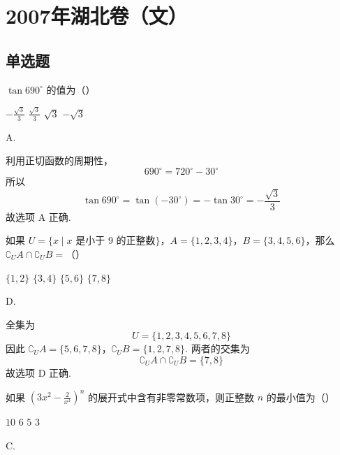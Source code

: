 \chapter{2007年湖北卷（文）}

\section{单选题}

\begin{problem}
\(\tan 690^{\circ}\) 的值为（\quad）

\choices
    {\( -\frac{\sqrt{3}}{3} \)}
    {\( \frac{\sqrt{3}}{3} \)}
    {\(\sqrt{3}\)}
    {\(-\sqrt{3}\)}
\end{problem}

\begin{answer}
A.
\end{answer}

\begin{solution}
利用正切函数的周期性，
\[
690^{\circ}=720^{\circ}-30^{\circ}
\]
所以
\[
\tan 690^{\circ}=\tan(-30^{\circ})=-\tan 30^{\circ}=-\frac{\sqrt{3}}{3}
\]
故选项 A 正确.
\end{solution}

\begin{problem}
如果 \( U = \{x \mid x \text{ 是小于 } 9 \text{ 的正整数}\} \)，\( A = \{1, 2, 3, 4\} \)，\( B = \{3, 4, 5, 6\} \)，那么 \( \complement_U A \cap \complement_U B = \)（\quad）

\choices
    {\( \{1, 2\} \)}
    {\( \{3, 4\} \)}
    {\( \{5, 6\} \)}
    {\(\{7,8\}\)}
\end{problem}

\begin{answer}
D.
\end{answer}

\begin{solution}
全集为
\[
U=\{1,2,3,4,5,6,7,8\}
\]
因此
\(\complement_U A=\{5,6,7,8\}\)，\(\complement_U B=\{1,2,7,8\}\).
两者的交集为
\[
\complement_U A\cap\complement_U B=\{7,8\}
\]
故选项 D 正确.
\end{solution}

\begin{problem}
如果 \(\left(3x^{2} - \frac{2}{x^{3}}\right)^{n}\) 的展开式中含有非零常数项，则正整数 \(n\) 的最小值为（\quad）

\choices
    {\(10\)}
    {\(6\)}
    {\(5\)}
    {\(3\)}
\end{problem}

\begin{answer}
C.
\end{answer}

